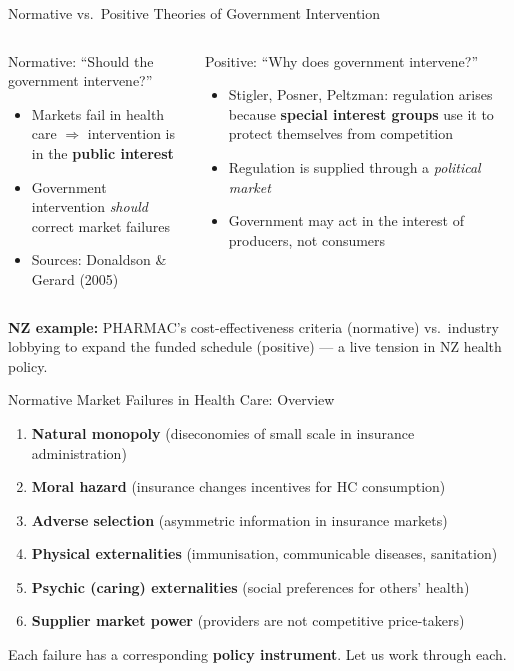 \documentclass[aspectratio=169, 12pt]{beamer}
\begin{document}
\begin{frame}{Normative vs.\ Positive Theories of Government Intervention}
  \begin{columns}
      \begin{block}{Normative: ``Should the government intervene?''}
        \small
        \begin{itemize}
          \item Markets fail in health care $\Rightarrow$ intervention is in the \textbf{public interest}
          \item Government intervention \emph{should} correct market failures
          \item Sources: Donaldson \& Gerard (2005)
        \end{itemize}
      \end{block}
      \begin{alertblock}{Positive: ``Why does government intervene?''}
        \small
        \begin{itemize}
          \item Stigler, Posner, Peltzman: regulation arises because \textbf{special interest groups}
                use it to protect themselves from competition
          \item Regulation is supplied through a \textit{political market}
          \item Government may act in the interest of producers, not consumers
        \end{itemize}
      \end{alertblock}
  \end{columns}
  \vspace{0.4em}
  {\small \textbf{NZ example:} PHARMAC's cost-effectiveness criteria (normative) vs.\ industry lobbying
  to expand the funded schedule (positive) --- a live tension in NZ health policy.}
\end{frame}

\begin{frame}{Normative Market Failures in Health Care: Overview}
  \begin{enumerate}
    \item \textbf{Natural monopoly} (diseconomies of small scale in insurance administration)
    \item \textbf{Moral hazard} (insurance changes incentives for HC consumption)
    \item \textbf{Adverse selection} (asymmetric information in insurance markets)
    \item \textbf{Physical externalities} (immunisation, communicable diseases, sanitation)
    \item \textbf{Psychic (caring) externalities} (social preferences for others' health)
    \item \textbf{Supplier market power} (providers are not competitive price-takers)
  \end{enumerate}
  \vspace{0.4em}
  Each failure has a corresponding \textbf{policy instrument}. Let us work through each.
\end{frame}
\end{document}
